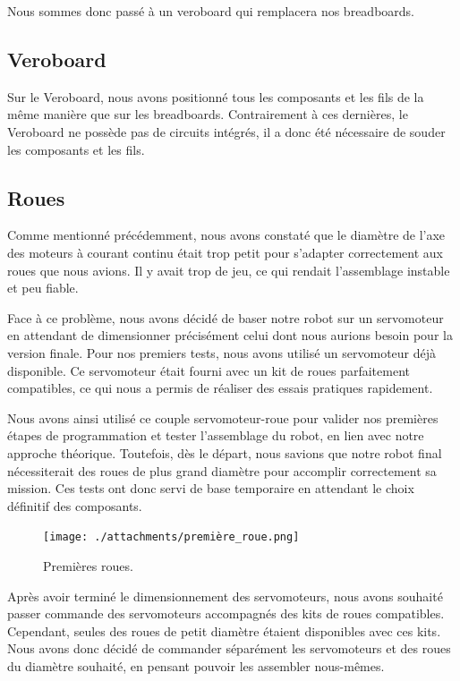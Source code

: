 \documentclass[a4paper,12pt]{report}  %
\begin{document}
Nous sommes donc passé à un veroboard qui remplacera nos breadboards.

\subsection{Veroboard}

Sur le Veroboard, nous avons positionné tous les composants et les fils de la même manière que sur les breadboards. Contrairement à ces dernières, le Veroboard ne possède pas de circuits intégrés, il a donc été nécessaire de souder les composants et les fils.


\subsection{Roues}

Comme mentionné précédemment, nous avons constaté que le diamètre de l’axe des moteurs à courant continu était trop petit pour s’adapter correctement aux roues que nous avions. Il y avait trop de jeu, ce qui rendait l’assemblage instable et peu fiable.

Face à ce problème, nous avons décidé de baser notre robot sur un servomoteur en attendant de dimensionner précisément celui dont nous aurions besoin pour la version finale. Pour nos premiers tests, nous avons utilisé un servomoteur déjà disponible. Ce servomoteur était fourni avec un kit de roues parfaitement compatibles, ce qui nous a permis de réaliser des essais pratiques rapidement.

Nous avons ainsi utilisé ce couple servomoteur-roue pour valider nos premières étapes de programmation et tester l’assemblage du robot, en lien avec notre approche théorique. Toutefois, dès le départ, nous savions que notre robot final nécessiterait des roues de plus grand diamètre pour accomplir correctement sa mission. Ces tests ont donc servi de base temporaire en attendant le choix définitif des composants.

\begin{figure}[H]
	\centering
	\texttt{[image: ./attachments/première\_roue.png]}
	\caption{Premières roues.}
\end{figure}

Après avoir terminé le dimensionnement des servomoteurs, nous avons souhaité passer commande des servomoteurs accompagnés des kits de roues compatibles. Cependant, seules des roues de petit diamètre étaient disponibles avec ces kits. Nous avons donc décidé de commander séparément les servomoteurs et des roues du diamètre souhaité, en pensant pouvoir les assembler nous-mêmes.
\end{document}
